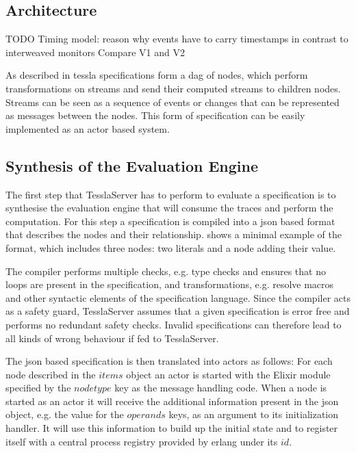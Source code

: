 \subsection{Architecture}
\label{sec:implementation:tesslaserver:architecture}

TODO Timing model: reason why events have to carry timestamps in contrast to interweaved monitors
Compare V1 and V2

As described in  \gls{tessla} specifications form a \gls{dag} of nodes, which perform transformations on streams and send their computed streams to children nodes.
Streams can be seen as a sequence of events or changes that can be represented as messages between the nodes.
This form of specification can be easily implemented as an actor based system.

\subsection{Synthesis of the Evaluation Engine}

The first step that TesslaServer has to perform to evaluate a specification is to synthesise the evaluation engine that will consume the traces and perform the computation.
For this step a specification is compiled into a \gls{json} based format that describes the nodes and their relationship.
 shows a minimal example of the format, which includes three nodes: two literals and a node adding their value.



The compiler performs multiple checks, e.g. type checks and ensures that no loops are present in the specification, and transformations, e.g. resolve macros and other syntactic elements of the specification language.
Since the compiler acts as a safety guard, TesslaServer assumes that a given specification is error free and performs no redundant safety checks.
Invalid specifications can therefore lead to all kinds of wrong behaviour if fed to TesslaServer.

The \gls{json} based specification is then translated into actors as follows: For each node described in the \(\mathit{items}\) object an actor is started with the Elixir module specified by the \(\mathit{nodetype}\) key as the message handling code.
When a node is started as an actor it will receive the additional information present in the \gls{json} object, e.g. the value for the \(\mathit{operands}\) keys, as an argument to its initialization handler.
It will use this information to build up the initial state and to register itself with a central process registry provided by erlang under its \(\mathit{id}\).

